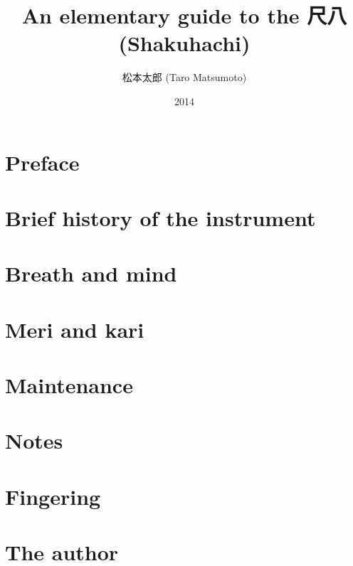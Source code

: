 \documentclass[b5paper]{memoir}
\begin{document}
\frontmatter

\title{An elementary guide to the 尺八 (Shakuhachi)}
\author{松本太郎 (Taro Matsumoto)}
\date{2014}
\maketitle

\newpage

\section{Preface}


\clearpage

\tableofcontents

\mainmatter

\section{Brief history of the instrument}


\section{Breath and mind}


\section{Meri and kari}


\section{Maintenance}


\section{Notes}


\appendix
\appendixpage

\section{Fingering}


\section{The author}


\backmatter
\end{document}

